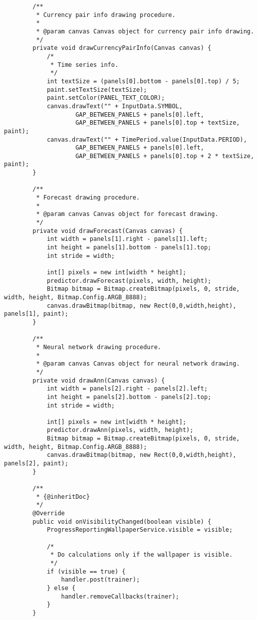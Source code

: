 \begin{verbatim}
        /**
         * Currency pair info drawing procedure.
         *
         * @param canvas Canvas object for currency pair info drawing.
         */
        private void drawCurrencyPairInfo(Canvas canvas) {
            /*
             * Time series info.
             */
            int textSize = (panels[0].bottom - panels[0].top) / 5;
            paint.setTextSize(textSize);
            paint.setColor(PANEL_TEXT_COLOR);
            canvas.drawText("" + InputData.SYMBOL,
                    GAP_BETWEEN_PANELS + panels[0].left,
                    GAP_BETWEEN_PANELS + panels[0].top + textSize, paint);
            canvas.drawText("" + TimePeriod.value(InputData.PERIOD),
                    GAP_BETWEEN_PANELS + panels[0].left,
                    GAP_BETWEEN_PANELS + panels[0].top + 2 * textSize, paint);
        }

        /**
         * Forecast drawing procedure.
         *
         * @param canvas Canvas object for forecast drawing.
         */
        private void drawForecast(Canvas canvas) {
            int width = panels[1].right - panels[1].left;
            int height = panels[1].bottom - panels[1].top;
            int stride = width;

            int[] pixels = new int[width * height];
            predictor.drawForecast(pixels, width, height);
            Bitmap bitmap = Bitmap.createBitmap(pixels, 0, stride, width, height, Bitmap.Config.ARGB_8888);
            canvas.drawBitmap(bitmap, new Rect(0,0,width,height), panels[1], paint);
        }

        /**
         * Neural network drawing procedure.
         *
         * @param canvas Canvas object for neural network drawing.
         */
        private void drawAnn(Canvas canvas) {
            int width = panels[2].right - panels[2].left;
            int height = panels[2].bottom - panels[2].top;
            int stride = width;

            int[] pixels = new int[width * height];
            predictor.drawAnn(pixels, width, height);
            Bitmap bitmap = Bitmap.createBitmap(pixels, 0, stride, width, height, Bitmap.Config.ARGB_8888);
            canvas.drawBitmap(bitmap, new Rect(0,0,width,height), panels[2], paint);
        }

        /**
         * {@inheritDoc}
         */
        @Override
        public void onVisibilityChanged(boolean visible) {
            ProgressReportingWallpaperService.visible = visible;

            /*
             * Do calculations only if the wallpaper is visible.
             */
            if (visible == true) {
                handler.post(trainer);
            } else {
                handler.removeCallbacks(trainer);
            }
        }


\end{verbatim}
